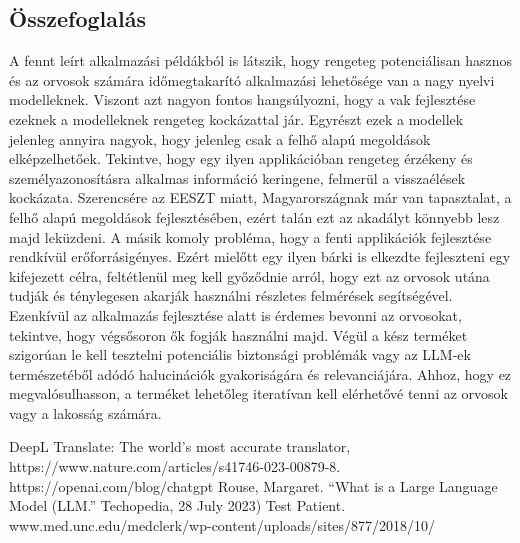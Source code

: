\documentclass{article}
\begin{document}
\begin{multicols}{2}
    \section{Összefoglalás}
    A fennt leírt alkalmazási példákból is látszik, hogy rengeteg potenciálisan hasznos és az orvosok számára időmegtakarító alkalmazási lehetősége van a nagy nyelvi modelleknek. Viszont azt nagyon fontos hangsúlyozni, hogy a vak fejlesztése ezeknek a modelleknek rengeteg kockázattal jár. Egyrészt ezek a modellek jelenleg annyira nagyok, hogy jelenleg csak a felhő alapú megoldások elképzelhetőek. Tekintve, hogy egy ilyen applikációban rengeteg érzékeny és személyazonosításra alkalmas információ keringene, felmerül a visszaélések kockázata. Szerencsére az EESZT miatt, Magyarországnak már van tapasztalat, a felhő alapú megoldások fejlesztésében, ezért talán ezt az akadályt könnyebb lesz majd leküzdeni. A másik komoly probléma, hogy a fenti applikációk fejlesztése rendkívül erőforrásigényes. Ezért mielőtt egy ilyen bárki is elkezdte fejleszteni egy kifejezett célra, feltétlenül meg kell győződnie arról, hogy ezt az orvosok utána tudják és ténylegesen akarják használni részletes felmérések segítségével. Ezenkívül az alkalmazás fejlesztése alatt is érdemes bevonni az orvosokat, tekintve, hogy végsősoron ők fogják használni majd. Végül a kész terméket szigorúan le kell tesztelni potenciális biztonsági problémák vagy az LLM-ek természetéből adódó halucinációk gyakoriságára és relevanciájára. Ahhoz, hogy ez megvalósulhasson, a terméket lehetőleg iteratívan kell elérhetővé tenni az orvosok vagy a lakosság számára.

\end{multicols}
\begin{thebibliography}{9}
DeepL Translate: The world's most accurate translator,
https://www.nature.com/articles/s41746-023-00879-8.
https://openai.com/blog/chatgpt
Rouse, Margaret. “What is a Large Language Model (LLM.” Techopedia, 28 July 2023)
Test Patient. www.med.unc.edu/medclerk/wp-content/uploads/sites/877/2018/10/
\end{thebibliography}
\end{document}
